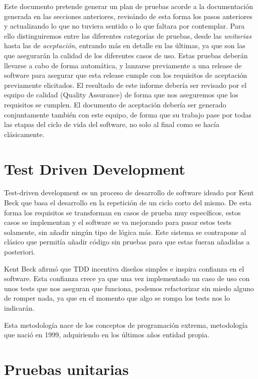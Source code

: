 \documentclass[12pt,a4paperpaper,]{report}
\begin{document}
Este documento pretende generar un plan de pruebas acorde a la
documentación generada en las secciones anteriores, revisándo de esta
forma los pasos anteriores y actualizando lo que no tuviera sentido o lo
que faltara por contemplar. Para ello distinguiremos entre las
diferentes categorías de pruebas, desde las \emph{unitarias} hasta las
de \emph{aceptación}, entrando más en detalle en las últimas, ya que son
las que asegurarán la calidad de los diferentes casos de uso. Estas
pruebas deberán llevarse a cabo de forma automática, y lanzarse
previamente a una release de software para asegurar que esta release
cumple con los requisitos de aceptación previamente elicitados. El
resultado de este informe debería ser revisado por el equipo de calidad
(Quality Assurance) de forma que nos aseguremos que los requisitos se
cumplen. El documento de aceptación debería ser generado conjuntamente
también con este equipo, de forma que su trabajo pase por todas las
etapas del ciclo de vida del software, no solo al final como se hacía
clásicamente.

\section{Test Driven Development}\label{test-driven-development}

Test-driven development es un proceso de desarrollo de software ideado
por Kent Beck que basa el desarrollo en la repetición de un ciclo corto
del mismo. De esta forma los requisitos se transforman en casos de
prueba muy específicos, estos casos se implementan y el software se va
mejorando para pasar estos tests solamente, sin añadir ningún tipo de
lógica más. Este sistema se contrapone al clásico que permitía añadir
código sin pruebas para que estas fueran añadidas a posteriori.

Kent Beck afirmó que TDD incentiva diseños simples e inspira confianza
en el software. Esta confianza crece ya que una vez implementado un caso
de uso con unos tests que nos aseguran que funciona, podemos
refactorizar sin miedo alguno de romper nada, ya que en el momento que
algo se rompa los tests nos lo indicarán.

Esta metodología nace de los conceptos de programación extrema,
metodología que nació en 1999, adquiriendo en los últimos años entidad
propia.

\section{Pruebas unitarias}\label{pruebas-unitarias}
\end{document}
